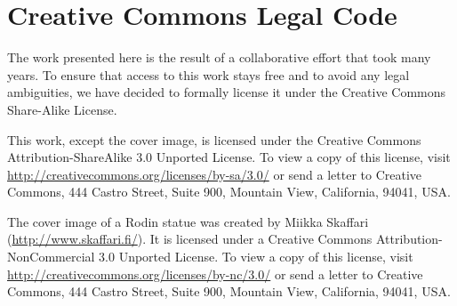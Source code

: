\section{Creative Commons Legal Code}
\label{sec:cc}        

The work presented here is the result of a collaborative effort
that took many years.  To ensure that access to this work stays free
and to avoid any legal ambiguities, we have decided to formally license
it under the Creative Commons Share-Alike License.

This work, except the cover image, is licensed under the Creative Commons Attribution-ShareAlike 3.0 Unported License. To view a copy of this license, visit \url{http://creativecommons.org/licenses/by-sa/3.0/} or send a letter to Creative Commons, 444 Castro Street, Suite 900, Mountain View, California, 94041, USA.

The cover image of a Rodin statue was created by Miikka Skaffari (\url{http://www.skaffari.fi/}).  It is licensed under a Creative Commons Attribution-NonCommercial 3.0 Unported License.  To view a copy of this license, visit \url{http://creativecommons.org/licenses/by-nc/3.0/} or send a letter to Creative Commons, 444 Castro Street, Suite 900, Mountain View, California, 94041, USA.


